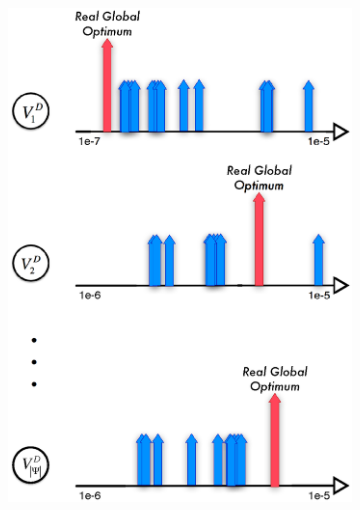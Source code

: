   \begin{figure}[ht]
      \centering
      \begin{subfigure}[t]{0.4\textwidth}
        \includegraphics[width=\textwidth]{Fig/Chapter2/popSampling.eps}
      \end{subfigure}
      \begin{subfigure}[t]{0.4\textwidth}

\end{subfigure}
\end{figure}
